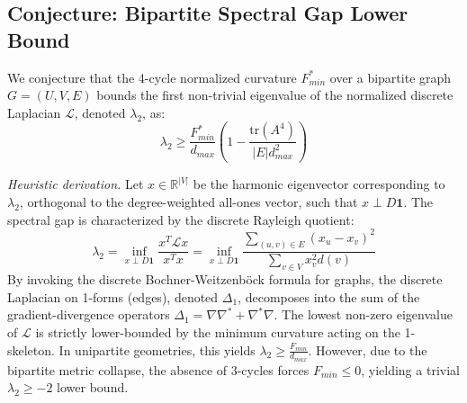 \documentclass{siuro250211}
\theoremstyle{remark}
\theoremstyle{plain}
\begin{document}
\subsection{Conjecture: Bipartite Spectral Gap Lower Bound}
\label{thm:spectralgap}
We conjecture that the 4-cycle normalized curvature $F_{min}^*$ over a bipartite graph $G = (U, V, E)$ bounds the first non-trivial eigenvalue of the normalized discrete Laplacian $\mathcal{L}$, denoted $\lambda_2$, as:
\begin{equation}
\lambda_2 \ge \frac{F_{min}^*}{d_{max}} \left( 1 - \frac{\text{tr}(A^4)}{|E| d_{max}^2} \right)
\end{equation}

\smallskip
\noindent\textit{Heuristic derivation.}\quad
Let $x \in \mathbb{R}^{|V|}$ be the harmonic eigenvector corresponding to $\lambda_2$, orthogonal to the degree-weighted all-ones vector, such that $x \perp D\mathbf{1}$. The spectral gap is characterized by the discrete Rayleigh quotient:
\begin{equation}
\lambda_2 = \inf_{x \perp D\mathbf{1}} \frac{x^T \mathcal{L} x}{x^T x} = \inf_{x \perp D\mathbf{1}} \frac{\sum_{(u,v) \in E} (x_u - x_v)^2}{\sum_{v \in V} x_v^2 d(v)}
\end{equation}
By invoking the discrete Bochner-Weitzenb{\"{o}}ck formula for graphs, the discrete Laplacian on 1-forms (edges), denoted $\Delta_1$, decomposes into the sum of the gradient-divergence operators $\Delta_1 = \nabla \nabla^* + \nabla^* \nabla$. The lowest non-zero eigenvalue of $\mathcal{L}$ is strictly lower-bounded by the minimum curvature acting on the 1-skeleton. In unipartite geometries, this yields $\lambda_2 \ge \frac{F_{min}}{d_{max}}$. However, due to the bipartite metric collapse, the absence of 3-cycles forces $F_{min} \le 0$, yielding a trivial $\lambda_2 \ge -2$ lower bound.
\end{document}
